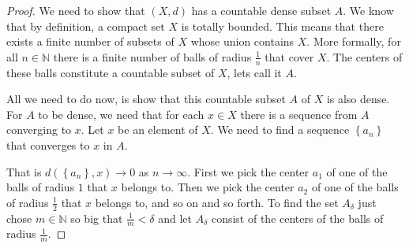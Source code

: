 \documentclass[a4paper]{report}
\theoremstyle{definition}
\begin{document}
\begin{proof}
  We need to show that $(X, d)$ has a countable dense subset $A$.  We know that
  by definition, a compact set $X$ is totally bounded.  This means that there
  exists a finite number of subsets of $X$ whose union contains $X$. More
  formally, for all $n \in \mathbb{N}$ there is a finite number of balls of
  radius $\frac{1}{n}$ that cover $X$. The centers of these balls constitute a
  countable subset of $X$, lets call it $A$. 

  All we need to do now, is show that this countable subset $A$ of $X$ is also
  dense.  For $A$ to be dense, we need that for each $x \in X$ there is a
  sequence from $A$ converging to $x$. Let $x$ be an element of $X$. We need to
  find a sequence $\left\{ a_n \right\}$ that converges to $x$ in $A$. 
  
  That is $d(\left\{ a_n \right\}, x) \rightarrow 0$ as $n \rightarrow \infty$.
  First we pick the center $a_1$ of one of the balls of radius $1$ that $x$
  belongs to. Then we pick the center $a_2$ of one of the balls of radius
  $\frac{1}{2}$ that $x$ belongs to, and so on and so forth. To find the set
  $A_\delta$ just chose $m \in \mathbb{N}$ so big that $\frac{1}{m} < \delta$
  and let $A_\delta$ consist of the centers of the balls of radius
  $\frac{1}{m}$.
\end{proof}
\end{document}
